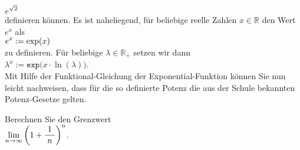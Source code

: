 $\displaystyle e^{\sqrt{2}}$
\\[0.2cm]
definieren k\"onnen.  Es ist naheliegend, f\"ur beliebige reelle Zahlen $x \in \mathbb{R}$ den
Wert $e^x$ als
\\[0.2cm]
\hspace*{1.3cm}
$\displaystyle e^x := \exp(x)$
\\[0.2cm]
zu definieren.  F\"ur beliebige $\lambda \in \mathbb{R}_+$ setzen wir dann
\\[0.2cm]
\hspace*{1.3cm}
$\lambda^x := \mathtt{exp}\bigl(x \cdot \ln(\lambda) \bigr)$.
\\[0.2cm]
Mit Hilfe der Funktional-Gleichung der Exponential-Funktion k\"onnen Sie nun leicht nachweisen, dass
f\"ur die so definierte Potenz die aus der Schule bekannten Potenz-Gesetze gelten. \eox

\exercise
Berechnen Sie den Grenzwert
\\[0.2cm]
\hspace*{1.3cm}
$\displaystyle\lim\limits_{n\rightarrow\infty} \left(1 + \frac{1}{\;n\;}\right)^n$.  \eox



